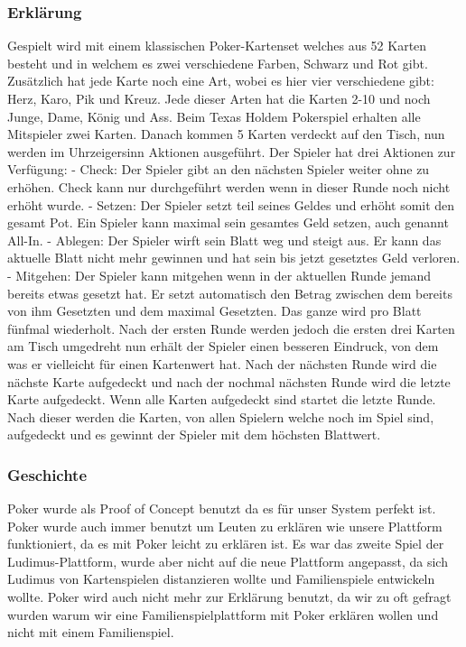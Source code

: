\subsubsection{Erklärung}
Gespielt wird mit einem klassischen Poker-Kartenset welches aus 52 Karten besteht und in welchem es zwei verschiedene Farben, Schwarz und Rot gibt. Zusätzlich hat jede Karte noch eine Art, wobei es hier vier verschiedene gibt: Herz, Karo, Pik und Kreuz. Jede dieser Arten hat die Karten 2-10 und noch Junge, Dame, König und Ass. Beim Texas Holdem Pokerspiel erhalten alle Mitspieler zwei Karten. Danach kommen 5 Karten verdeckt auf den Tisch, nun werden im Uhrzeigersinn Aktionen ausgeführt. Der Spieler hat drei Aktionen zur Verfügung: 
\newline \newline \tab 
- Check: Der Spieler gibt an den nächsten Spieler weiter ohne zu erhöhen. Check \tab kann nur durchgeführt werden wenn in dieser Runde noch nicht erhöht wurde.
\newline \tab 
- Setzen: Der Spieler setzt teil seines Geldes und erhöht somit den gesamt Pot. \tab Ein Spieler kann maximal sein gesamtes Geld setzen, auch genannt All-In.
\newline \tab 
- Ablegen: Der Spieler wirft sein Blatt weg und steigt aus. Er kann das aktuelle \tab Blatt nicht mehr gewinnen und hat sein bis jetzt gesetztes Geld verloren.
\newline \tab 
- Mitgehen: Der Spieler kann mitgehen wenn in der aktuellen Runde jemand \tab bereits etwas gesetzt hat. Er setzt automatisch den Betrag zwischen dem bereits \tab von ihm Gesetzten und dem maximal Gesetzten.
\newline \newline
Das ganze wird pro Blatt fünfmal wiederholt. Nach der ersten Runde werden jedoch die ersten drei Karten am Tisch umgedreht nun erhält der Spieler einen besseren Eindruck, von dem was er vielleicht für einen Kartenwert hat. Nach der nächsten Runde wird die nächste Karte aufgedeckt und nach der nochmal nächsten Runde wird die letzte Karte aufgedeckt. Wenn alle Karten aufgedeckt sind startet die letzte Runde. Nach dieser werden die Karten, von allen Spielern welche noch im Spiel sind, aufgedeckt und es gewinnt der Spieler mit dem höchsten Blattwert.
\subsubsection{Geschichte}
Poker wurde als Proof of Concept benutzt da es für unser System perfekt ist. Poker wurde auch immer benutzt um Leuten zu erklären wie unsere Plattform funktioniert, da es mit Poker leicht zu erklären ist. Es war das zweite Spiel der Ludimus-Plattform, wurde aber nicht auf die neue Plattform angepasst, da sich Ludimus von Kartenspielen distanzieren wollte und Familienspiele entwickeln wollte. Poker wird auch nicht mehr zur Erklärung benutzt, da wir zu oft gefragt wurden warum wir eine Familienspielplattform mit Poker erklären wollen und nicht mit einem Familienspiel.
